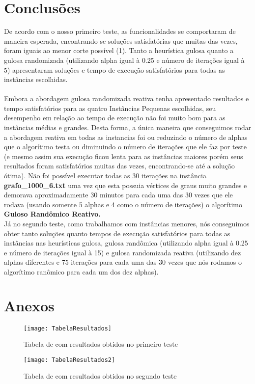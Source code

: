 \documentclass[a4paper, 12pt]{article}
\begin{document}
\section{Conclusões}
De acordo com o nosso primeiro teste, as funcionalidades se comportaram de maneira esperada, encontrando-se soluções satisfatórias que muitas das vezes, foram iguais ao menor corte possível (1). Tanto a heurística gulosa quanto a gulosa randomizada (utilizando alpha igual à 0.25 e número de iterações igual à 5) apresentaram soluções e tempo de execução satisfatórios para todas as instâncias escolhidas.
\\ 
\\
\ident Embora a abordagem gulosa randomizada reativa tenha apresentado resultados e tempo satisfatórios para as 
quatro Instâncias Pequenas escolhidas, seu desempenho em relação ao tempo de execução não foi muito bom para as instâncias médias e grandes. Desta forma, a única maneira que conseguimos rodar a abordagem reativa em todas as instancias foi ou reduzindo o número de alphas que o algorítimo testa ou diminuindo o número de iterações que ele faz por teste (e mesmo assim sua execução ficou lenta para as instâncias maiores porém seus resultados foram satisfatórios muitas das vezes, encontrando-se até a solução ótima). Não foi possível executar todas as 30 iterações na instância \textbf{grafo\_1000\_6.txt} uma vez que esta possuia vértices de graus muito grandes e demorava aproximadamente 30 minutos para cada uma das 30 vezes que ele rodava (usando somente 5 alphas e 4 como o número de iterações) o algorítimo \textbf{Guloso Randômico Reativo.} \\

\ident Já no segundo teste, como trabalhamos com instâncias menores, nós conseguimos obter tanto soluções quanto tempos de execução satisfatórios para todas as instâncias nas heurísticas gulosa, gulosa randômica (utilizando alpha igual à 0.25 e número de iterações igual à 15) e gulosa randomizada reativa (utilizando dez alphas diferentes e 75 iterações para cada uma das 30 vezes que nós rodamos o algorítimo ranômico para cada um dos dez alphas).

\section{Anexos}

  \begin{figure}[h]
    \centering
    \texttt{[image: TabelaResultados]}
    \caption{Tabela de com resultados obtidos no primeiro teste }
  \end{figure}

  \begin{figure}[h]
    \centering
    \texttt{[image: TabelaResultados2]}
    \caption{Tabela de com resultados obtidos no segundo teste }
  \end{figure}
\end{document}
